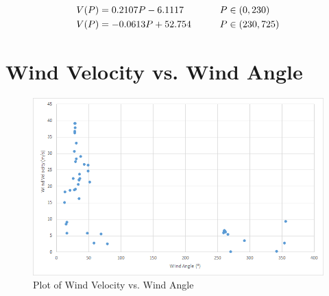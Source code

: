 \documentclass{article}
\begin{document}
\begin{align*}
\centering
    V(P) &= 0.2107P - 6.1117&& \text{\qquad $P\in(0,230)$} \\
    V(P) &= -0.0613P + 52.754 && \text{\qquad $P\in(230,725)$} \\
\end{align*}
\part{Wind Velocity vs. Wind Angle}
\begin{figure}[H]
  \centering
  \includegraphics[width=\textwidth]{alan-data.png}
  \caption{Plot of Wind Velocity vs. Wind Angle}
\end{figure}
\end{document}
